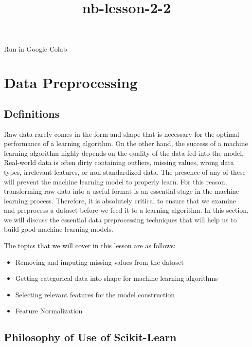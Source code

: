 \documentclass{article}
\title{nb-lesson-2-2}
\providecommand{\tightlist}{%
      \setlength{\itemsep}{0pt}\setlength{\parskip}{0pt}}
\begin{document}
    
    \maketitle
    
    

    
    Run in Google Colab

    \section{Data Preprocessing}\label{data-preprocessing}

    \subsection{Definitions}\label{definitions}

Raw data rarely comes in the form and shape that is necessary for the
optimal performance of a learning algorithm. On the other hand, the
success of a machine learning algorithm highly depends on the quality of
the data fed into the model. Real-world data is often dirty containing
outliers, missing values, wrong data types, irrelevant features, or
non-standardized data. The presence of any of these will prevent the
machine learning model to properly learn. For this reason, transforming
raw data into a useful format is an essential stage in the machine
learning process. Therefore, it is absolutely critical to ensure that we
examine and preprocess a dataset before we feed it to a learning
algorithm. In this section, we will discuss the essential data
preprocessing techniques that will help us to build good machine
learning models.

The topics that we will cover in this lesson are as follows:

\begin{itemize}
\tightlist
\item
  Removing and imputing missing values from the dataset
\item
  Getting categorical data into shape for machine learning algorithms
\item
  Selecting relevant features for the model construction
\item
  Feature Normalization
\end{itemize}

    \subsection{Philosophy of Use of
Scikit-Learn}\label{philosophy-of-use-of-scikit-learn}
\end{document}
